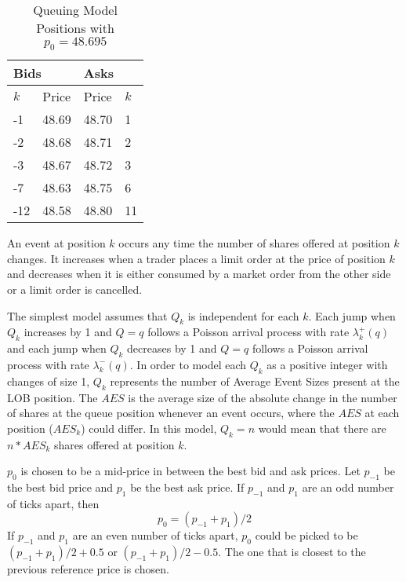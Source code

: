 \begin{table}[htbp]
\caption{Queuing Model Positions with $p_0 = 48.695$} \label{tab:queue_positions}
\begin{center}
\begin{tabular}{ll|ll}
\hline \hline
\multicolumn{2}{l|}{\textbf{Bids}} & \multicolumn{2}{l}{\textbf{Asks}} \\
\hline
$k$          & Price          & Price           & $k$          \\
\hline
-1             & 48.69          & 48.70           & 1             \\
-2             & 48.68          & 48.71           & 2            \\
-3             & 48.67          & 48.72           & 3            \\
-7             & 48.63          & 48.75           & 6            \\
-12             & 48.58          & 48.80           & 11          
\end{tabular}
\end{center}
\end{table}

An event at position $k$ occurs any time the number of shares offered at position $k$ changes. It increases when a trader places a limit order at the price of position $k$ and decreases when it is either consumed by a market order from the other side or a limit order is cancelled.

The simplest model assumes that $Q_k$ is independent for each $k$. Each jump when $Q_k$ increases by 1 and $Q = q$ follows a Poisson arrival process with rate $\lambda^+_k(q)$ and each jump when $Q_k$ decreases by 1 and $Q = q$ follows a Poisson arrival process with rate $\lambda^-_k(q)$. In order to model each $Q_k$ as a positive integer with changes of size 1, $Q_k$ represents the number of Average Event Sizes present at the LOB position. The $AES$ is the average size of the absolute change in the number of shares at the queue position whenever an event occurs, where the $AES$ at each position ($AES_k$) could differ. In this model, $Q_k = n$ would mean that there are $n*AES_k$ shares offered at position $k$.

$p_0$ is chosen to be a mid-price in between the best bid and ask prices. Let $p_{-1}$ be the best bid price and $p_1$ be the best ask price. If $p_{-1}$ and $p_1$ are an odd number of ticks apart, then 
$$p_0=  (p_{-1}+p_1)/2$$
If $p_{-1}$ and $p_1$ are an even number of ticks apart, $p_0$ could be picked to be $(p_{-1}+p_1)/2 + 0.5$ or $(p_{-1}+p_1)/2 - 0.5$. The one that is closest to the previous reference price is chosen.

